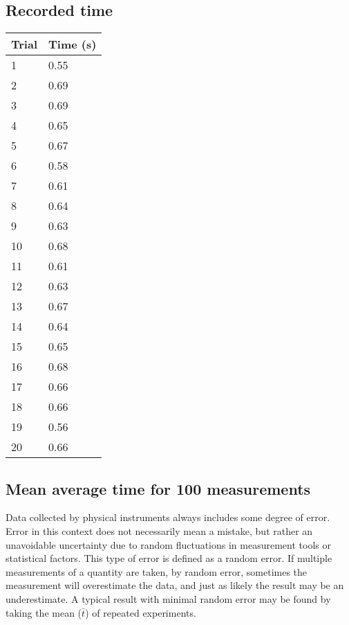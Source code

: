 \documentclass[11pt, letterpaper, includehead]{article}
\begin{document}
\subsection{Recorded time} %
\begin{center}
  \begin{tabular}[H]{| m{2cm} | m{2cm} |}
    \hline
    \textbf{Trial} & \textbf{Time (s)} \\
    \hline
    1              & 0.55              \\
    \hline
    2              & 0.69              \\
    \hline
    3              & 0.69              \\
    \hline
    4              & 0.65              \\
    \hline
    5              & 0.67              \\
    \hline
    6              & 0.58              \\
    \hline
    7              & 0.61              \\
    \hline
    8              & 0.64              \\
    \hline
    9              & 0.63              \\
    \hline
    10             & 0.68              \\
    \hline
    11             & 0.61              \\
    \hline
    12             & 0.63              \\
    \hline
    13             & 0.67              \\
    \hline
    14             & 0.64              \\
    \hline
    15             & 0.65              \\
    \hline
    16             & 0.68              \\
    \hline
    17             & 0.66              \\
    \hline
    18             & 0.66              \\
    \hline
    19             & 0.56              \\
    \hline
    20             & 0.66              \\
    \hline
  \end{tabular}
\end{center}

\setcounter{subsection}{3} %
\subsection{Mean average time for 100 measurements} %
Data collected by physical instruments always includes some degree
of error. Error in this context does not necessarily mean a mistake,
but rather an unavoidable uncertainty due to random fluctuations in
measurement tools or statistical factors. This type of error is
defined as a random error. If multiple measurements of a quantity
are taken, by random error, sometimes the measurement will overestimate
the data, and just as likely the result may be an underestimate. A
typical result with minimal random error may be found by taking the
mean ($\bar{t}$) of repeated experiments.
\end{document}
